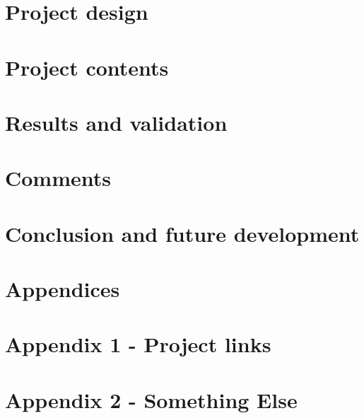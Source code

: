 \documentclass[12pt, a4paper]{report}
\begin{document}
    \chapter{Project design}\label{ch:project-design}
    

    \chapter{Project contents}\label{ch:project-contents}
    

    \chapter{Results and validation}\label{ch:results-and-validation}
    

    \chapter{Comments}\label{ch:comments}
    

    \chapter{Conclusion and future development}\label{ch:summary}
    

    \pagebreak
    \printbibliography

    \pagebreak
    \appendix
    \chapter*{Appendices}
    \renewcommand{\thechapter}{\arabic{chapter}}

    \label{chapter:appendix-project-links}
    {\clearpage\relax\chapter*{Appendix 1 - Project links}}
    

    \clearpage
    \label{chapter:appendix-something-else}
    \chapter*{Appendix 2 - Something Else}
    
\end{document}
